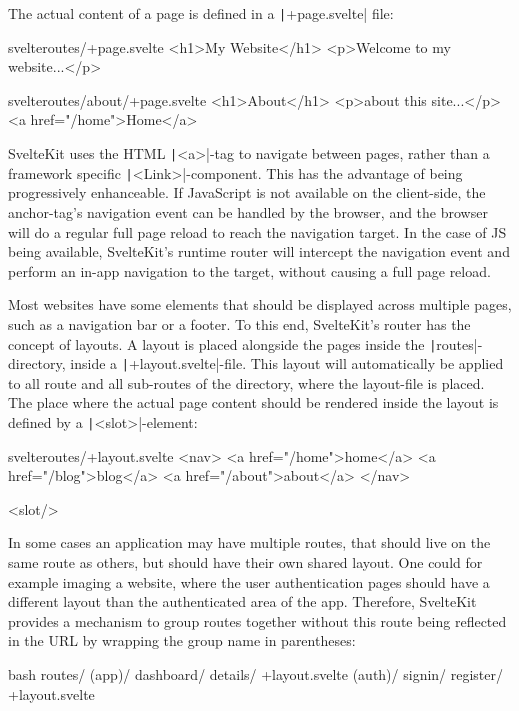 The actual content of a page is defined in a \texttt|+page.svelte| file:
\begin{myminted}{svelte}{routes/+page.svelte}
<h1>My Website</h1>
<p>Welcome to my website...</p>
\end{myminted}
\begin{myminted}{svelte}{routes/about/+page.svelte}
<h1>About</h1>
<p>about this site...</p>
<a href="/home">Home</a>
\end{myminted}

SvelteKit uses the HTML \texttt|<a>|-tag to navigate between pages, rather than a framework specific \texttt|<Link>|-component. This has the advantage of being progressively enhanceable. If JavaScript is not available on the client-side, the anchor-tag's navigation event can be handled by the browser, and the browser will do a regular full page reload to reach the navigation target. In the case of JS being available, SvelteKit's runtime router will intercept the navigation event and perform an in-app navigation to the target, without causing a full page reload.

Most websites have some elements that should be displayed across multiple pages, such as a navigation bar or a footer. To this end, SvelteKit's router has the concept of layouts. A layout is placed alongside the pages inside the \texttt|routes|-directory, inside a \texttt|+layout.svelte|-file. This layout will automatically be applied to all route and all sub-routes of the directory, where the layout-file is placed. The place where the actual page content should be rendered inside the layout is defined by a \texttt|<slot>|-element:

\begin{myminted}{svelte}{routes/+layout.svelte}
<nav>
    <a href="/home">home</a>
    <a href="/blog">blog</a>
    <a href="/about">about</a>
</nav>

<slot/>
\end{myminted}

In some cases an application may have multiple routes, that should live on the same route as others, but should have their own shared layout. One could for example imaging a website, where the user authentication pages should have a different layout than the authenticated area of the app. Therefore, SvelteKit provides a mechanism to group routes together without this route being reflected in the URL by wrapping the group name in parentheses:
\begin{myminted}[highlightlines={2,6}]{bash}{}
routes/
  (app)/
    dashboard/
    details/
    +layout.svelte
  (auth)/
    signin/
    register/
    +layout.svelte
\end{myminted}

